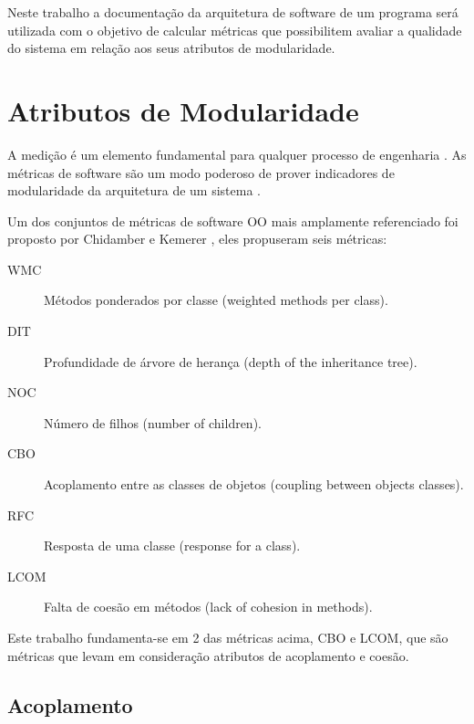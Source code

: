 Neste trabalho a documentação da arquitetura de software de um programa será
utilizada com o objetivo de calcular métricas que possibilitem avaliar a
qualidade do sistema em relação aos seus atributos de modularidade.

\section{Atributos de Modularidade}

A medição é um elemento fundamental para qualquer processo de engenharia
\cite{engenhariaDeSoftwarePressman}. As métricas de software são um modo
poderoso de prover indicadores de modularidade da arquitetura de um sistema
\cite{OntheModular}.

Um dos conjuntos de métricas de software OO
mais amplamente referenciado foi proposto por Chidamber e Kemerer
\cite{engenhariaDeSoftwarePressman}, eles propuseram seis métricas:

\begin{description}

\item[WMC]
Métodos ponderados por classe (weighted methods per class).

\item[DIT]
Profundidade de árvore de herança (depth of the inheritance tree).

\item[NOC]
Número de filhos (number of children).

\item[CBO]
Acoplamento entre as classes de objetos (coupling between objects classes).

\item[RFC]
Resposta de uma classe (response for a class).

\item[LCOM]
Falta de coesão em métodos (lack of cohesion in methods).

\end{description}

Este trabalho fundamenta-se em 2 das métricas acima, CBO e LCOM, que são
métricas que levam em consideração atributos de acoplamento e coesão.

\subsection{Acoplamento}


